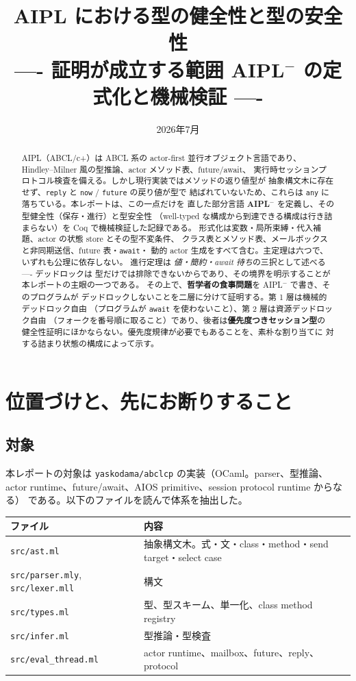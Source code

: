\documentclass[11pt,a4paper]{ltjsarticle}
\title{AIPL における型の健全性と型の安全性\\
\large ---- 証明が成立する範囲 AIPL$^-$ の定式化と機械検証 ----}
\author{}
\date{2026年7月}
\theoremstyle{definition}
\theoremstyle{remark}
\begin{document}
\maketitle

\begin{abstract}
AIPL（ABCL/c+）は ABCL 系の actor-first 並行オブジェクト言語であり、
Hindley--Milner 風の型推論、actor メソッド表、future/await、
実行時セッションプロトコル検査を備える。しかし現行実装ではメソッドの返り値型が
抽象構文木に存在せず、\verb|reply| と \verb|now| / \verb|future| の戻り値が型で
結ばれていないため、これらは \verb|any| に落ちている。本レポートは、この一点だけを
直した部分言語 \textbf{AIPL$^-$} を定義し、その型健全性（保存・進行）と型安全性
（well-typed な構成から到達できる構成は行き詰まらない）を Coq で機械検証した記録である。
形式化は変数・局所束縛・代入補題、actor の状態 store とその型不変条件、
クラス表とメソッド表、メールボックスと非同期送信、future 表・\verb|await|・
動的 actor 生成をすべて含む。主定理は六つで、いずれも公理に依存しない。
進行定理は \emph{値・簡約・await 待ち}の三択として述べる ---- デッドロックは
型だけでは排除できないからであり、その境界を明示することが本レポートの主眼の一つである。
その上で、\textbf{哲学者の食事問題}を AIPL$^-$ で書き、そのプログラムが
デッドロックしないことを二層に分けて証明する。第 1 層は機械的デッドロック自由
（プログラムが \texttt{await} を使わないこと）、第 2 層は資源デッドロック自由
（フォークを番号順に取ること）であり、後者は\textbf{優先度つきセッション型}の
健全性証明にほかならない。優先度規律が必要でもあることを、素朴な割り当てに
対する詰まり状態の構成によって示す。
\end{abstract}

\tableofcontents

\section{位置づけと、先にお断りすること}

\subsection{対象}

本レポートの対象は \verb|yaskodama/abclcp| の実装（OCaml。parser、型推論、
actor runtime、future/await、AIOS primitive、session protocol runtime からなる）
である。以下のファイルを読んで体系を抽出した。

\begin{center}
\begin{tabular}{@{}ll@{}}
\toprule
ファイル & 内容 \\
\midrule
\verb|src/ast.ml| & 抽象構文木。式・文・class・method・send target・select case \\
\verb|src/parser.mly|, \verb|src/lexer.mll| & 構文 \\
\verb|src/types.ml| & 型、型スキーム、単一化、class method registry \\
\verb|src/infer.ml| & 型推論・型検査 \\
\verb|src/eval_thread.ml| & actor runtime、mailbox、future、reply、protocol \\
\bottomrule
\end{tabular}
\end{center}
\end{document}
